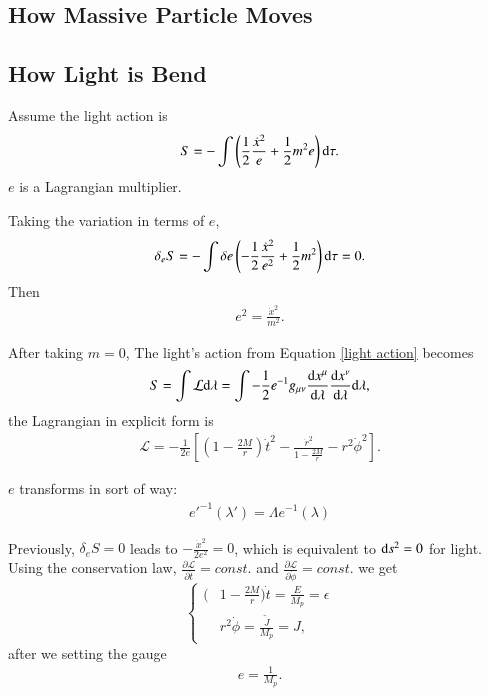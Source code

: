 \documentclass[openany,10pt]{book}
\theoremstyle{definition}
\theoremstyle{definition}
\theoremstyle{remark}
\newcommand{\be}{\begin{eqnarray}}
\newcommand{\ee}{\end{eqnarray}}
\begin{document}
\subsection{How Massive Particle Moves}
\subsection{How Light is Bend}
Assume the light action is 
\be
S=-\int\left(\frac12\frac{\dot{x}^2}{e}+\frac12 m^2 e\right){\rm d}\tau.
\ee\label{light action}
$e$ is a Lagrangian multiplier.

Taking the variation in  terms of $e$,
\be
\delta_e S=-\int\delta e \left(-\frac12\frac{\dot{x}^2}{e^2}+\frac12m^2\right){\rm d}\tau =0.
\ee
Then 
\be
e^2=\frac{\dot{x}^2}{m^2}.
\ee


After taking $m=0$, The light's action from Equation \ref{light action} becomes 
\be
S=\int\mathcal{L}{\rm d}\lambda=\int -\frac12e^{-1}g_{\mu\nu}\frac{{\rm d}x^\mu}{{\rm d}\lambda}\frac{{\rm d}x^\nu}{{\rm d}\lambda}{\rm d}\lambda,
\ee
the Lagrangian in explicit form is 
\be
\mathcal{L}=-\frac{1}{2e}\left[\left(1-\frac{2M}{r}\right)\dot{t}^2-\frac{\dot{r}^2}{1-\frac{2M}{r}}-r^2\dot{\phi}^2\right].
\ee

$e$ transforms in sort of way:
\be
e'^{-1}(\lambda')=\Lambda e^{-1}(\lambda)
\ee

Previously, $\delta_e S=0$ leads to $-\frac{\dot{x}^2}{2e^2}=0$, which is equivalent to ${\rm d}s^2=0$ for light.\\


Using the conservation law, $\frac{\partial\mathcal{L}}{\partial\dot{t}}=const.$ and $\frac{\partial\mathcal{L}}{\partial\dot{\phi}}=const.$ we get
\begin{equation}
    \left\{\begin{aligned}
        \bigg( &1-\frac{2M}{r}\bigg)\dot{t}=\frac{E}{M_p}=\epsilon\\
        &r^2\dot{\phi}=\frac{\tilde{J}}{M_p}=J,
    \end{aligned}\right.
\end{equation}
after we setting the gauge
\be
e=\frac{1}{M_p}.
\ee
\end{document}
